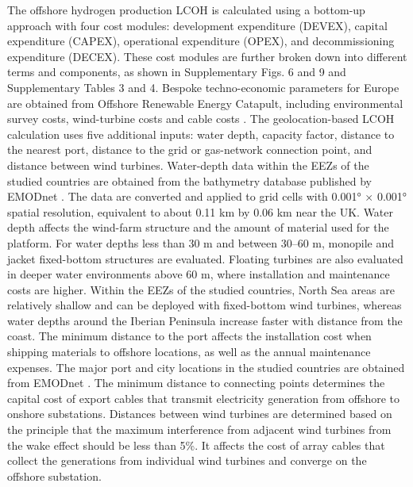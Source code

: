 \documentclass[pdflatex,sn-mathphys,Numbered]{sn-jnl}%
\begin{document}
The offshore hydrogen production LCOH is calculated using a bottom-up approach with four cost modules: development expenditure (DEVEX), capital expenditure (CAPEX), operational expenditure (OPEX), and decommissioning expenditure (DECEX). These cost modules are further broken down into different terms and components, as shown in Supplementary Figs. 6 and 9 and Supplementary Tables 3 and 4. Bespoke techno-economic parameters for Europe are obtained from Offshore Renewable Energy Catapult, including environmental survey costs, wind-turbine costs and cable costs \cite{OffshoreWindandHydrogen}.
The geolocation-based LCOH calculation uses five additional inputs: water depth, capacity factor, distance to the nearest port, distance to the grid or gas-network connection point, and distance between wind turbines.
Water-depth data within the EEZs of the studied countries are obtained from the bathymetry database published by EMODnet \cite{bathymetry_2022}. The data are converted and applied to grid cells with 0.001° $\times$ 0.001° spatial resolution, equivalent to about 0.11 km by 0.06 km near the UK.
Water depth affects the wind-farm structure and the amount of material used for the platform. For water depths less than 30 m and between 30--60 m, monopile and jacket fixed-bottom structures are evaluated. Floating turbines are also evaluated in deeper water environments above 60 m, where installation and maintenance costs are higher. Within the EEZs of the studied countries, North Sea areas are relatively shallow and can be deployed with fixed-bottom wind turbines, whereas water depths around the Iberian Peninsula increase faster with distance from the coast.
The minimum distance to the port affects the installation cost when shipping materials to offshore locations, as well as the annual maintenance expenses. The major port and city locations in the studied countries are obtained from EMODnet \cite{EMODnet}.
The minimum distance to connecting points determines the capital cost of export cables that transmit electricity generation from offshore to onshore substations.
Distances between wind turbines are determined based on the principle that the maximum interference from adjacent wind turbines from the wake effect should be less than 5\%. It affects the cost of array cables that collect the generations from individual wind turbines and converge on the offshore substation.
\end{document}
